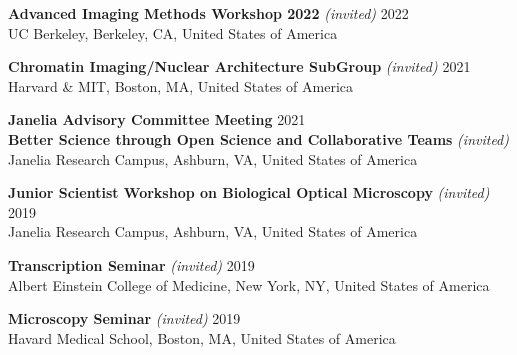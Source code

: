 \documentclass[margin,line]{res}
\begin{document}
\begin{resume}
\vspace*{-3mm}
{\bf  Advanced Imaging Methods Workshop 2022}  {\it (invited)} \hfill 2022\\
UC Berkeley, Berkeley, CA, United States of America %

\vspace*{-3mm}
{\bf  Chromatin Imaging/Nuclear Architecture SubGroup}  {\it (invited)} \hfill 2021\\
Harvard \& MIT, Boston, MA, United States of America %

\vspace*{-3mm}
{\bf  Janelia Advisory Committee Meeting}  \hfill 2021\\
{\bf Better Science through Open Science and Collaborative Teams}  {\it (invited)} \\
Janelia Research Campus, Ashburn, VA, United States of America %

\vspace*{-3mm}
{\bf  Junior Scientist Workshop on Biological Optical Microscopy} {\it (invited)}  \hfill 2019\\
Janelia Research Campus, Ashburn, VA, United States of America %

\vspace*{-3mm}
{\bf  Transcription Seminar} {\it (invited)}  \hfill 2019\\
Albert Einstein College of Medicine, New York, NY, United States of America%

\vspace*{-3mm}
{\bf  Microscopy Seminar} {\it (invited)} \hfill 2019\\
Havard Medical School, Boston, MA, United States of America%


\end{resume}
\end{document}
